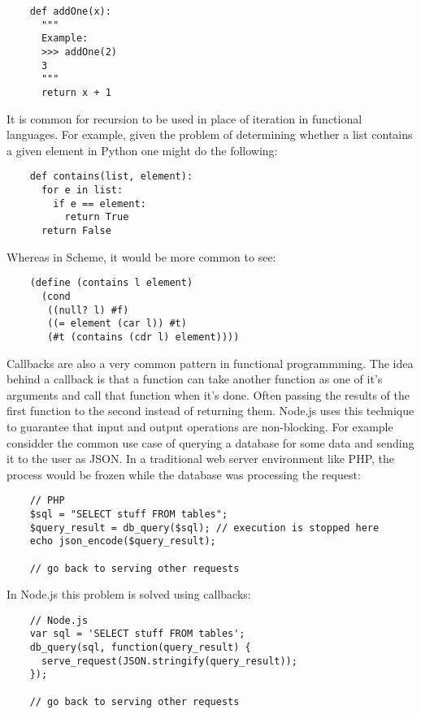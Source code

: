 \documentclass[11pt]{article}
\begin{document}
\begin{verbatim}
    def addOne(x):
      """
      Example:
      >>> addOne(2)
      3
      """
      return x + 1
\end{verbatim}

   
   It is common for recursion to be used in place of iteration in
   functional languages.  For example, given the problem of
   determining whether a list contains a given element in Python one
   might do the following:
   
\begin{verbatim}
    def contains(list, element):
      for e in list:
        if e == element:
          return True
      return False
\end{verbatim}

   
   Whereas in Scheme, it would be more common to see:
   
\begin{verbatim}
    (define (contains l element)
      (cond
       ((null? l) #f)
       ((= element (car l)) #t)
       (#t (contains (cdr l) element))))
\end{verbatim}

   
   Callbacks are also a very common pattern in functional
   programmming.  The idea behind a callback is that a function can
   take another function as one of it's arguments and call that
   function when it's done.  Often passing the results of the first
   function to the second instead of returning them.  Node.js uses
   this technique to guarantee that input and output operations are
   non-blocking.  For example considder the common use case of
   querying a database for some data and sending it to the user as
   JSON.  In a traditional web server environment like PHP, the
   process would be frozen while the database was processing the
   request:
   
\begin{verbatim}
    // PHP
    $sql = "SELECT stuff FROM tables";
    $query_result = db_query($sql); // execution is stopped here
    echo json_encode($query_result);
    
    // go back to serving other requests
\end{verbatim}

   
   In Node.js this problem is solved using callbacks:
   
\begin{verbatim}
    // Node.js
    var sql = 'SELECT stuff FROM tables';
    db_query(sql, function(query_result) {
      serve_request(JSON.stringify(query_result));
    });
    
    // go back to serving other requests
\end{verbatim}
\end{document}
